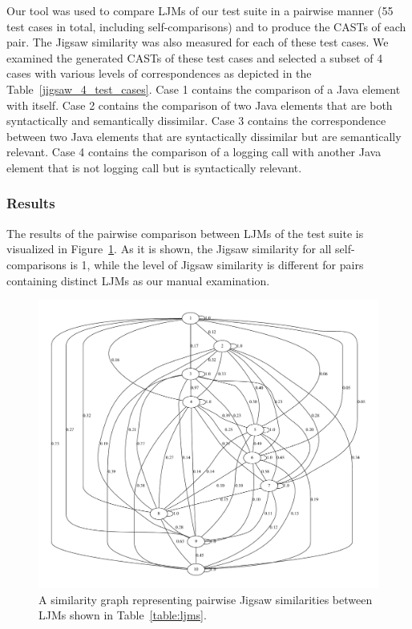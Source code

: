 Our tool was used to compare LJMs of our test suite in a pairwise manner (55 test cases in total, including self-comparisons) and to produce the CASTs of each pair. The Jigsaw similarity was also measured for each of these test cases.
We examined the generated CASTs of these test cases and selected a subset of 4 cases with various levels of correspondences as depicted in the Table~\ref{jigsaw_4_test_cases}. Case 1 contains the comparison of a Java element with itself. Case 2 contains the comparison of two Java elements that are both syntactically and semantically dissimilar.  Case 3 contains the correspondence between two Java elements that are syntactically dissimilar but are semantically relevant. Case 4 contains the comparison of a logging call with another Java element that is not logging call but is syntactically relevant.

\subsubsection{Results}  \label{study1-results}
The results of the pairwise comparison between LJMs of the test suite is visualized in Figure~\ref{fig:jigsaw_graph}. As it is shown, the Jigsaw similarity for all self-comparisons is 1, while  the level of Jigsaw similarity is different for pairs containing distinct LJMs as our manual examination.

\begin{figure} [H]
  \centering\includegraphics [width = \textwidth]{graphviz/jigsaw.pdf}
  \caption{A similarity graph representing pairwise Jigsaw similarities between LJMs shown in Table~\ref{table:ljms}.}
  \label{fig:jigsaw_graph}
\end{figure}


